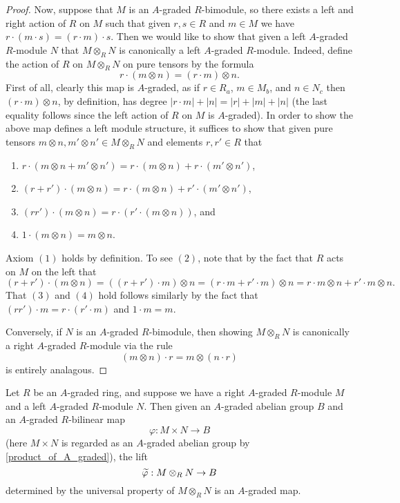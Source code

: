 \documentclass[../main.tex]{subfiles}
\begin{document}
\begin{proof}
	Now, suppose that $M$ is an $A$-graded $R$-bimodule, so there exists a left and right action of $R$ on $M$ such that given $r,s\in R$ and $m\in M$ we have $r\cdot(m\cdot s)=(r\cdot m)\cdot s$. Then we would like to show that given a left $A$-graded $R$-module $N$ that $M\otimes_RN$ is canonically a left $A$-graded $R$-module. Indeed, define the action of $R$ on $M\otimes_RN$ on pure tensors by the formula
	\[r\cdot(m\otimes n)=(r\cdot m)\otimes n.\]
	First of all, clearly this map is $A$-graded, as if $r\in R_a$, $m\in M_b$, and $n\in N_c$ then $(r\cdot m)\otimes n$, by definition, has degree $|r\cdot m|+|n|=|r|+|m|+|n|$ (the last equality follows since the left action of $R$ on $M$ is $A$-graded). In order to show the above map defines a left module structure, it suffices to show that given pure tensors $m\otimes n,m'\otimes n'\in M\otimes_RN$ and elements $r,r'\in R$ that
	\begin{enumerate}
		\item $r\cdot(m\otimes n+m'\otimes n')=r\cdot(m\otimes n)+r\cdot( m'\otimes n')$,
		\item $(r+r')\cdot(m\otimes n)=r\cdot(m\otimes n)+r'\cdot(m'\otimes n')$,
		\item $(rr')\cdot(m\otimes n)=r\cdot(r'\cdot(m\otimes n))$, and
		\item $1\cdot (m\otimes n)=m\otimes n$.
	\end{enumerate}
	Axiom $(1)$ holds by definition. To see $(2)$, note that by the fact that $R$ acts on $M$ on the left that
	\[(r+r')\cdot(m\otimes n)=((r+r')\cdot m)\otimes n=(r\cdot m+r'\cdot m)\otimes n=r\cdot m\otimes n+r'\cdot m\otimes n.\]
	That $(3)$ and $(4)$ hold follows similarly by the fact that $(rr')\cdot m=r\cdot(r'\cdot m)$ and $1\cdot m=m$.

	Conversely, if $N$ is an $A$-graded $R$-bimodule, then showing $M\otimes_RN$ is canonically a right $A$-graded $R$-module via the rule
	\[(m\otimes n)\cdot r=m\otimes(n\cdot r)\]
	is entirely analagous.
\end{proof}

\begin{lemma}
	Let $R$ be an $A$-graded ring, and suppose we have a right $A$-graded $R$-module $M$ and a left $A$-graded $R$-module $N$. Then given an $A$-graded abelian group $B$ and an $A$-graded $R$-bilinear map
	\[\varphi:M\times N\to B\]
	(here $M\times N$ is regarded as an $A$-graded abelian group by \autoref{product_of_A_graded}), the lift
	\[\widetilde\varphi:M\otimes_RN\to B\]
	determined by the universal property of $M\otimes_RN$ is an $A$-graded map.
\end{lemma}
\end{document}
